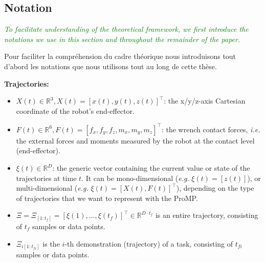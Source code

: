 \documentclass[utf8]{frontiersSCNS} %
\newcommand{\quest}[1]{\textcolor{green}{\textit{#1}}}
\begin{document}

\subsection{Notation}\label{sec:notation}

\quest{To facilitate understanding of the theoretical framework, we first introduce the notations we use in this section and throughout the remainder of the paper.}

Pour faciliter la compréhension du cadre théorique nous introduisons tout d'abord les notations que nous utilisons tout au long de cette thèse.

\noindent
\textbf{Trajectories:}
\begin{itemize}
\item $X(t)\in \mathbb{R}^3, X(t) = [x(t), y(t), z(t)]^\top$: the x/y/z-axis Cartesian coordinate of the robot's end-effector.
\item $F(t) \in \mathbb{R}^6, F(t) = [f_x, f_y, f_z, m_x, m_y, m_z]^\top$: the wrench contact forces, \textit{i.e.} the external forces and moments measured by the robot at the contact level (end-effector).
\item $\xi(t) \in \mathbb{R}^D$: the generic vector containing the current value or state of the trajectories at time $t$. It can be mono-dimensional (\textit{e.g.} $\xi(t) = [z(t)]$), or multi-dimensional (\textit{e.g.} $\xi(t) = [X(t), F(t)]^\top$), depending on the type of trajectories that we want to represent with the ProMP.


\item $\Xi = \Xi_{[1:t_{f}]} = [\xi(1), \ldots, \xi(t_{f})]^\top \in \mathbb{R}^{D \cdot t_{f}}$ is an entire trajectory, consisting of $t_f$ samples or data points. 

\item $\Xi_{i[1:t_{fi}]}$ is the $i$-th demonstration (trajectory) of a task, consisting of $t_{fi}$ samples or data points. 


\end{itemize}
\end{document}

